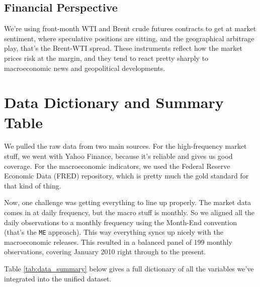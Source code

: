 \documentclass[11pt,a4paper]{article}
\begin{document}
\subsection{Financial Perspective}

We're using front-month WTI and Brent crude futures 
contracts to get at market sentiment, where speculative positions are 
sitting, and the geographical arbitrage play, that's the Brent-WTI spread. 
These instruments reflect how the market prices risk at the margin, 
and they tend to react pretty sharply to macroeconomic news and geopolitical developments.





\section{Data Dictionary and Summary Table}

We pulled the raw data from two main sources. For the high-frequency market stuff, 
we went with Yahoo Finance, because it's reliable and gives us good coverage. 
For the macroeconomic indicators, we used the Federal Reserve Economic Data (FRED) 
repository, which is pretty much the gold standard for that kind of thing. 

Now, one challenge was getting everything to line up properly. The market data 
comes in at daily frequency, but the macro stuff is monthly. So we aligned all 
the daily observations to a monthly frequency using the Month-End convention 
(that's the \texttt{ME} approach). This way everything syncs up nicely with 
the macroeconomic releases. This resulted in a balanced panel of 199 monthly 
observations, covering January 2010 right through to the present. 

Table \ref{tab:data_summary} below gives a full dictionary of all the variables 
we've integrated into the unified dataset.
\end{document}
